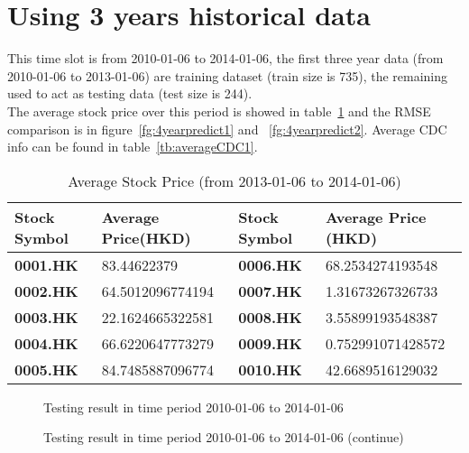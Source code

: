 \section{Using 3 years historical data}

This time slot is from 2010-01-06 to 2014-01-06, the first three year data (from 2010-01-06 to 2013-01-06) are training dataset (train size is 735), the remaining used to act as testing data (test size is 244).\\


The average stock price over this period is showed in table~\ref{tb:avg20132014} and the RMSE comparison is in figure~\ref{fg:4yearpredict1} and ~\ref{fg:4yearpredict2}. Average CDC info can be found in table~\ref{tb:averageCDC1}.\\
\begin{table}[h]
	\centering
	\begin{tabular}{|l|l|l|l|}
		\hline
		\textbf{Stock Symbol} & \textbf{Average Price(HKD)} & \textbf{Stock Symbol} & \textbf{Average Price (HKD)} \\ \hline
		\textbf{0001.HK}      & 83.44622379       & \textbf{0006.HK}      & 68.2534274193548      \\ \hline
		\textbf{0002.HK}      & 64.5012096774194     & \textbf{0007.HK}      & 1.31673267326733      \\ \hline
		\textbf{0003.HK}      & 22.1624665322581      & \textbf{0008.HK}      & 3.55899193548387      \\ \hline
		\textbf{0004.HK}      & 66.6220647773279      & \textbf{0009.HK}      & 0.752991071428572     \\ \hline
		\textbf{0005.HK}      & 84.7485887096774      & \textbf{0010.HK}      & 42.6689516129032      \\ \hline
	\end{tabular}
	\caption{Average Stock Price (from 2013-01-06 to 2014-01-06)}
	\label{tb:avg20132014}
\end{table}

\begin{figure}[h]
	\centering
	\caption{Testing result in time period 2010-01-06 to 2014-01-06}
	\label{fg:3yearpredict1}
\end{figure}

\begin{figure}[h]
	\centering
	\caption{Testing result in time period 2010-01-06 to 2014-01-06 (continue)}
	\label{fg:3yearpredict2}
\end{figure}

